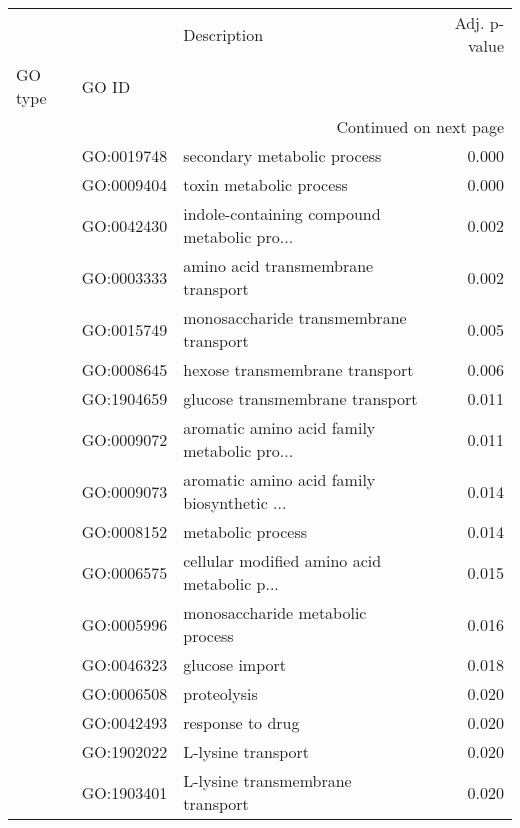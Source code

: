 \begin{longtable}{lllr}
\toprule
   &            &                                  Description &  Adj. p-value \\
GO type & GO ID &                                              &               \\
\midrule
\endhead
\midrule
\multicolumn{4}{r}{{Continued on next page}} \\
\midrule
\endfoot

\bottomrule
\endlastfoot
\multirow{66}{*}{BP} & GO:0019748 &                  secondary metabolic process &         0.000 \\
   & GO:0009404 &                      toxin metabolic process &         0.000 \\
   & GO:0042430 &  indole-containing compound metabolic pro... &         0.002 \\
   & GO:0003333 &           amino acid transmembrane transport &         0.002 \\
   & GO:0015749 &       monosaccharide transmembrane transport &         0.005 \\
   & GO:0008645 &               hexose transmembrane transport &         0.006 \\
   & GO:1904659 &              glucose transmembrane transport &         0.011 \\
   & GO:0009072 &  aromatic amino acid family metabolic pro... &         0.011 \\
   & GO:0009073 &  aromatic amino acid family biosynthetic ... &         0.014 \\
   & GO:0008152 &                            metabolic process &         0.014 \\
   & GO:0006575 &  cellular modified amino acid metabolic p... &         0.015 \\
   & GO:0005996 &             monosaccharide metabolic process &         0.016 \\
   & GO:0046323 &                               glucose import &         0.018 \\
   & GO:0006508 &                                  proteolysis &         0.020 \\
   & GO:0042493 &                             response to drug &         0.020 \\
   & GO:1902022 &                           L-lysine transport &         0.020 \\
   & GO:1903401 &             L-lysine transmembrane transport &         0.020 \\

\end{longtable}
